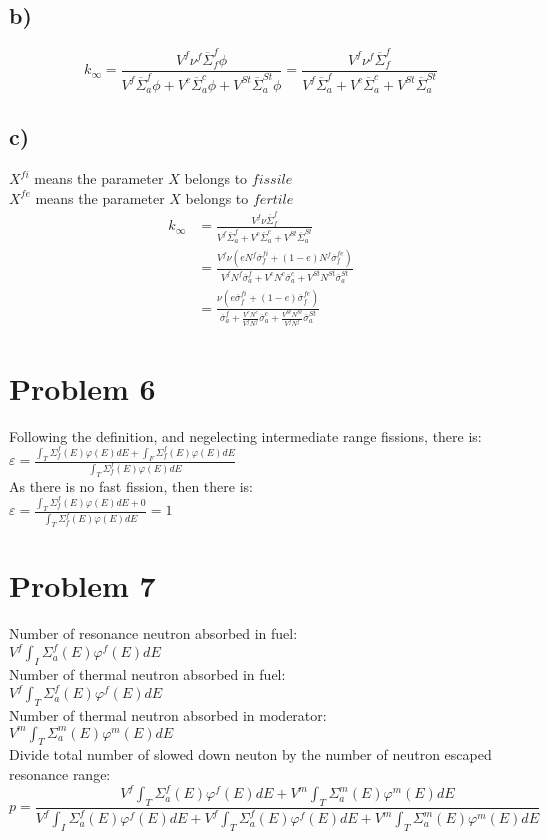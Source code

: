 \documentclass{article}
\begin{document}
\subsection*{b)}
\[k_\infty = \frac{V^f \nu^f \overline{\Sigma}^f_f\phi}{V^f\overline{\Sigma}_a^f\phi+V^c\overline{\Sigma}_a^c\phi+V^{St}\overline{\Sigma}_a^{St}\phi}=\frac{V^f \nu^f \overline{\Sigma}^f_f}{V^f\overline{\Sigma}_a^f+V^c\overline{\Sigma}_a^c+V^{St}\overline{\Sigma}_a^{St}}\]
\subsection*{c)}
\(X^{fi}\) means the parameter \(X\) belongs to \(fissile\)\\
\(X^{fe}\) means the parameter \(X\) belongs to \(fertile\)\\
\begin{align*}
    k_\infty&=\frac{V^f \nu \overline{\Sigma}^f_f}{V^f\overline{\Sigma}_a^f+V^c\overline{\Sigma}_a^c+V^{St}\overline{\Sigma}_a^{St}}\\
            &=\frac{V^f \nu \left( eN^{f}\overline{\sigma}^{fi}_f+(1-e)N^f\overline{\sigma}^{fe}_f\right)}{V^fN^f\overline{\sigma}_a^f+V^cN^c\overline{\sigma}_a^c+V^{St}N^{St}\overline{\sigma}_a^{St}}\\
            &=\frac{\nu\left(e\overline{\sigma}^{fi}_f+(1-e)\overline{\sigma}^{fe}_f\right)}{\overline{\sigma}_a^f+\frac{V^cN^c}{V^fN^f}\overline{\sigma}_a^c+\frac{V^{St}N^{St}}{V^fN^f}\overline{\sigma}_a^{St}}
\end{align*}\newpage
\section*{Problem 6}
Following the definition, and negelecting intermediate range fissions, there is:\\
\(\varepsilon = \displaystyle \frac {\int_T\Sigma^f_f(E)\varphi(E)dE+\int_F\Sigma^f_f(E)\varphi(E)dE}{\int_T\Sigma^f_f(E)\varphi(E)dE}\)\\
As there is no fast fission, then there is:\\
\(\varepsilon = \displaystyle \frac {\int_T\Sigma^f_f(E)\varphi(E)dE+0}{\int_T\Sigma^f_f(E)\varphi(E)dE}=1\)
\section*{Problem 7}
Number of resonance neutron absorbed in fuel:\\
\(\displaystyle V^f\int_I \Sigma_a^f(E)\varphi^f(E)dE\)\\
Number of thermal neutron absorbed in fuel:\\
\(\displaystyle V^f\int_T \Sigma_a^f(E)\varphi^f(E)dE\)\\
Number of thermal neutron absorbed in moderator:\\
\(\displaystyle V^m\int_T \Sigma_a^m(E)\varphi^m(E)dE\)\\
Divide total number of slowed down neuton by the number of neutron escaped resonance range:\\
\[p=\frac{ \displaystyle {V^f\int_T \Sigma_a^f(E)\varphi^f(E)dE+ V^m\int_T \Sigma_a^m(E)\varphi^m(E)dE}}{\displaystyle {V^f\int_I \Sigma_a^f(E)\varphi^f(E)dE+V^f\int_T \Sigma_a^f(E)\varphi^f(E)dE+V^m\int_T \Sigma_a^m(E)\varphi^m(E)dE}}\]
\end{document}
